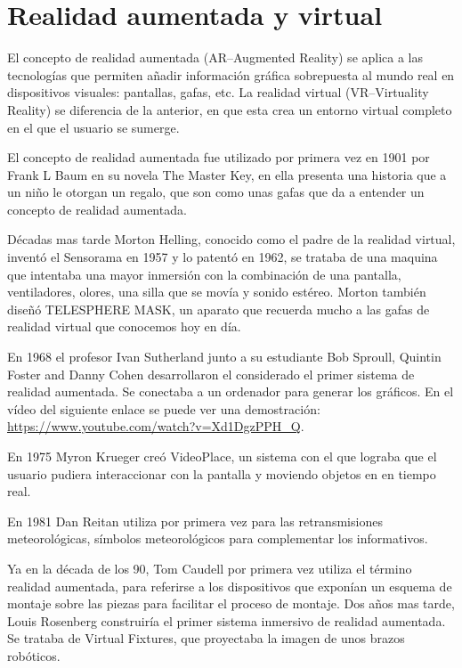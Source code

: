 

\section{Realidad aumentada y virtual}

El concepto de realidad aumentada (AR--Augmented Reality) se aplica a las tecnologías que permiten añadir información gráfica sobrepuesta al mundo real en dispositivos visuales: pantallas, gafas, etc.
La realidad virtual (VR--Virtuality Reality) se diferencia de la anterior, en que esta crea un entorno virtual completo en el que el usuario se sumerge.
 


El concepto de realidad aumentada fue utilizado por primera vez en 1901 por Frank L Baum en su novela The Master Key\cite{theMasterKey}, en ella presenta una historia que a un niño le otorgan un regalo, que son como unas gafas que da a entender un concepto de realidad aumentada.

Décadas mas tarde Morton Helling, conocido como el padre de la realidad virtual, inventó el Sensorama en 1957 y lo patentó en 1962, se trataba de una maquina que intentaba una mayor inmersión con la combinación de una pantalla, ventiladores, olores, una silla que se movía y sonido estéreo. Morton también diseñó TELESPHERE MASK, un aparato que recuerda mucho a las gafas de realidad virtual que conocemos hoy en día.


En 1968 el profesor Ivan Sutherland junto a su estudiante Bob Sproull, Quintin Foster and Danny Cohen desarrollaron el considerado el primer sistema de realidad aumentada. Se conectaba a un ordenador para generar los gráficos. En el vídeo del siguiente enlace se puede ver una demostración: \url{https://www.youtube.com/watch?v=Xd1DgzPPH_Q}.


En 1975 Myron Krueger creó VideoPlace, un sistema con el que lograba que el usuario pudiera interaccionar con la pantalla y moviendo objetos en en tiempo real\cite{ARevolution}.



En 1981 Dan Reitan utiliza por primera vez para las retransmisiones meteorológicas, símbolos meteorológicos para complementar los informativos.

Ya en la década de los 90, Tom Caudell por primera vez utiliza el término realidad aumentada, para referirse a los dispositivos que exponían un esquema de montaje sobre las piezas para facilitar el proceso de montaje. 
Dos años mas tarde, Louis Rosenberg construiría el primer sistema inmersivo de realidad aumentada.  Se trataba de Virtual Fixtures, que proyectaba la imagen de unos brazos robóticos.

